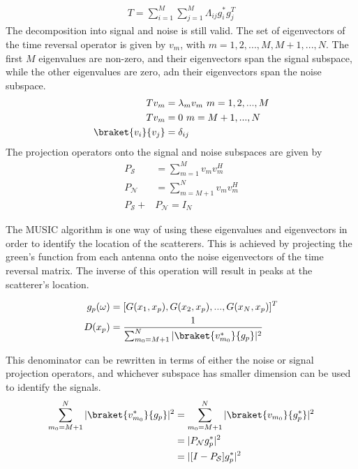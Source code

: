 \documentclass[14pt]{article}
\begin{document}
	\begin{align}
		T = \sum_{i=1}^M \sum_{j=1}^M \Lambda_{ij}g_i^* g_j^T
	\end{align}
	The decomposition into signal and noise is still valid.  The set of eigenvectors
	of the time reversal operator is given by $v_m$, with $m = 1,2,...,M,M+1,...,N$.
	The first $M$ eigenvalues are non-zero, and their eigenvectors span the signal
	subspace, while the other eigenvalues are zero, adn their eigenvectors span
	the noise subspace.  
	\begin{align}
		T v_m &= \lambda_m v_m~m = 1,2,...,M \\
		T v_m &= 0~m = M+1,...,N \\
		\braket{v_i}{v_j} &= \delta_{ij} \\
	\end{align}
	The projection operators onto the signal and noise subspaces are given by
	\begin{align}
		P_{\mathcal{S}} &= \sum_{m=1}^M v_mv_m^H \\
		P_{\mathcal{N}} &= \sum_{m=M+1}^N v_m v_m^H \\
		P_{\mathcal{S}} + &P_{\mathcal{N}} = I_N
	\end{align}

	The MUSIC algorithm is one way of using these eigenvalues and eigenvectors in
	order to identify the location of the scatterers.  This is achieved by projecting
	the green's function from each antenna onto the noise eigenvectors of the 
	time reversal matrix.  The inverse of this operation will result in peaks 
	at the scatterer's location.

	\begin{align}
		g_p(\omega) &= [G(x_1,x_p), G(x_2,x_p),...,G(x_N,x_p)]^T \\
		D(x_p) &= \frac{1}{\sum_{m_0 = M+1}^N |\braket{v_{m_0}^*}{g_p}|^2}
	\end{align}
	
	This denominator can be rewritten in terms of either the noise or signal 
	projection operators, and whichever subspace has smaller dimension can be used
	to identify the signals.
	\begin{align}
		\sum_{m_0 = M+1}^N |\braket{v_{m_0}^*}{g_p}|^2 &= \sum_{m_0 = M+1}^N |\braket{v_{m_0}}{g_p^*}|^2 \\
					&=	|P_{\mathcal{N}} g_p^*|^2 \\
					&= |[I - P_{\mathcal{S}}]g_p^*|^2 
	\end{align}
\end{document}
